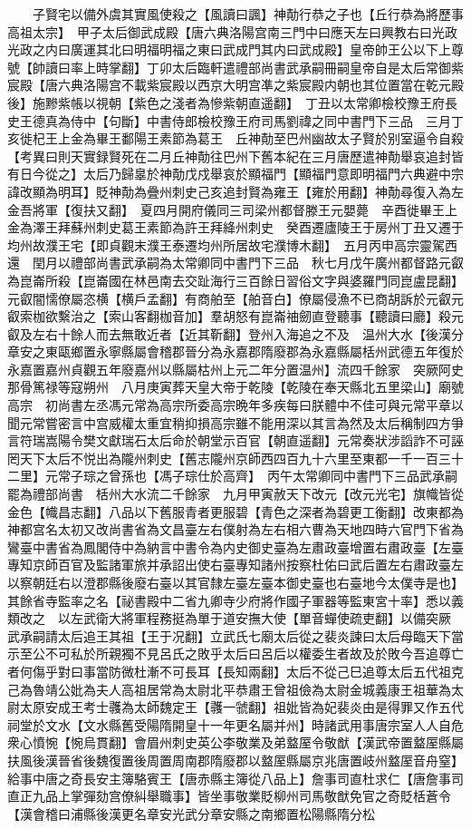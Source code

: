 　　子賢宅以備外虞其實風使殺之【風讀曰諷】神勣行恭之子也【丘行恭為將歷事高祖太宗】　甲子太后御武成殿【唐六典洛陽宫南三門中曰應天左曰興教右曰光政光政之内曰廣運其北曰明福明福之東曰武成門其内曰武成殿】皇帝帥王公以下上尊號【帥讀曰率上時掌翻】丁卯太后臨軒遣禮部尚書武承嗣冊嗣皇帝自是太后常御紫宸殿【唐六典洛陽宫不載紫宸殿以西京大明宫凖之紫宸殿内朝也其位置當在乾元殿後】施黲紫帳以視朝【紫色之淺者為慘紫朝直遥翻】　丁丑以太常卿檢校豫王府長史王德真為侍中【句斷】中書侍郎檢校豫王府司馬劉禕之同中書門下三品　三月丁亥徙杞王上金為畢王鄱陽王素節為葛王　丘神勣至巴州幽故太子賢於别室逼令自殺　【考異曰則天實録賢死在二月丘神勣往巴州下舊本紀在三月唐歷遣神勣舉哀追封皆有日今從之】太后乃歸辠於神勣戊戍舉哀於顯福門【顯福門意即明福門六典避中宗諱改顯為明耳】貶神勣為疊州刺史己亥追封賢為雍王【雍於用翻】神勣尋復入為左金吾將軍【復扶又翻】　夏四月開府儀同三司梁州都督滕王元嬰薨　辛酉徙畢王上金為澤王拜蘇州刺史葛王素節為許王拜絳州刺史　癸酉遷廬陵王于房州丁丑又遷于均州故濮王宅【即貞觀末濮王泰遷均州所居故宅濮博木翻】　五月丙申高宗靈駕西還　閏月以禮部尚書武承嗣為太常卿同中書門下三品　秋七月戊午廣州都督路元叡為崑崙所殺【崑崙國在林邑南去交趾海行三百餘日習俗文字與婆羅門同崑盧昆翻】元叡闇懦僚屬恣横【横戶孟翻】有商舶至【舶音白】僚屬侵漁不已商胡訴於元叡元叡索枷欲繫治之【索山客翻枷音加】羣胡怒有崑崙䄂劒直登聽事【聽讀曰廳】殺元叡及左右十餘人而去無敢近者【近其靳翻】登州入海追之不及　温州大水【後漢分章安之東甌鄉置永寧縣屬會稽郡晉分為永嘉郡隋廢郡為永嘉縣屬栝州武德五年復於永嘉置嘉州貞觀五年廢嘉州以縣屬枯州上元二年分置温州】流四千餘家　突厥阿史那骨篤禄等寇朔州　八月庚寅葬天皇大帝于乾陵【乾陵在奉天縣北五里梁山】廟號高宗　初尚書左丞馮元常為高宗所委高宗晩年多疾每曰朕體中不佳可與元常平章以聞元常嘗密言中宫威權太重宜稍抑損高宗雖不能用深以其言為然及太后稱制四方爭言符瑞嵩陽令樊文獻瑞石太后命於朝堂示百官【朝直遥翻】元常奏狀涉謟詐不可誣罔天下太后不悦出為隴州刺史【舊志隴州京師西四百九十六里至東都一千一百三十二里】元常子琮之曾孫也【馮子琮仕於高齊】　丙午太常卿同中書門下三品武承嗣罷為禮部尚書　栝州大水流二千餘家　九月甲寅赦天下改元【改元光宅】旗幟皆從金色【幟昌志翻】八品以下舊服青者更服碧【青色之深者為碧更工衡翻】改東都為神都宫名太初又改尚書省為文昌臺左右僕射為左右相六曹為天地四時六官門下省為鸞臺中書省為鳳閣侍中為納言中書令為内史御史臺為左肅政臺增置右肅政臺【左臺專知京師百官及監諸軍旅并承詔出使右臺專知諸州按察杜佑曰武后置左右肅政臺左以察朝廷右以澄郡縣後廢右臺以其官隸左臺左臺本御史臺也右臺地今太僕寺是也】其餘省寺監率之名【祕書殿中二省九卿寺少府將作國子軍器等監東宮十率】悉以義類改之　以左武衛大將軍程務挺為單于道安撫大使【單音蟬使疏吏翻】以備突厥　武承嗣請太后追王其祖【王于况翻】立武氏七廟太后從之裴炎諫曰太后母臨天下當示至公不可私於所親獨不見呂氏之敗乎太后曰呂后以權委生者故及於敗今吾追尊亡者何傷乎對曰事當防微杜漸不可長耳【長知兩翻】太后不從己巳追尊太后五代祖克己為魯靖公妣為夫人高祖居常為太尉北平恭肅王曾祖儉為太尉金城義康王祖華為太尉太原安成王考士彠為太師魏定王【彠一虢翻】祖妣皆為妃裴炎由是得罪又作五代祠堂於文水【文水縣舊受陽隋開皇十一年更名屬并州】時諸武用事唐宗室人人自危衆心憤惋【惋烏貫翻】會眉州刺史英公李敬業及弟盩厔令敬猷【漢武帝置盩厔縣屬扶風後漢晉省後魏復置後周置周南郡隋廢郡以盩厔縣屬京兆唐置岐州盩厔音舟窒】給事中唐之奇長安主簿駱賓王【唐赤縣主簿從八品上】詹事司直杜求仁【唐詹事司直正九品上掌彈劾宫僚糾舉職事】皆坐事敬業貶柳州司馬敬猷免官之奇貶栝蒼令【漢會稽曰浦縣後漢更名章安光武分章安縣之南鄉置松陽縣隋分松